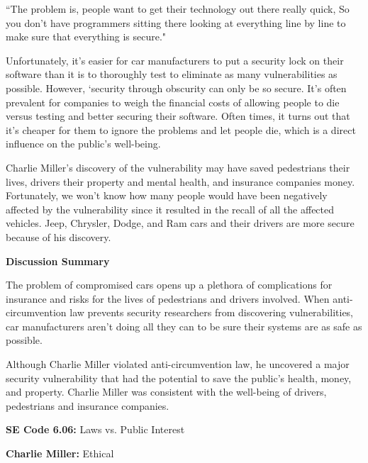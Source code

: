 \documentclass[12pt]{article}
\begin{document}
\begin{multicols}{2}
``The problem is, people want to get their technology out there really quick, So you don’t have programmers sitting there looking at everything line by line to make sure that everything is secure."\cite{insuranceRisks}

Unfortunately, it's easier for car manufacturers to put a security lock on their software than it is to thoroughly test to eliminate as many vulnerabilities as possible. \cite{chris} However, `security through obscurity can only be so secure.\cite{chris} It's often prevalent for companies to weigh the financial costs of allowing people to die versus testing and better securing their software. \cite{turner} Often times, it turns out that it's cheaper for them to ignore the problems and let people die, which is a direct influence on the public's well-being. \cite{turner}

Charlie Miller's discovery of the vulnerability may have saved pedestrians their lives, drivers their property and mental health, and insurance companies money. Fortunately, we won't know how many people would have been negatively affected by the vulnerability since it resulted in the recall of all the affected vehicles. \cite{recall} Jeep, Chrysler, Dodge, and Ram cars and their drivers are more secure because of his discovery. \cite{recall}

\vspace{.5cm}\hspace{-.5cm}\textbf{Discussion Summary}\vspace{.2cm}

The problem of compromised cars opens up a plethora of complications for insurance and risks for the lives of pedestrians and drivers involved. When anti-circumvention law prevents security researchers from discovering vulnerabilities, car manufacturers aren't doing all they can to be sure their systems are as safe as possible. 

Although Charlie Miller violated anti-circumvention law, he uncovered a major security vulnerability that had the potential to save the public's health, money, and property. Charlie Miller was consistent with the well-being of drivers, pedestrians and insurance companies.

\begin{framed}
\hspace{-.67cm}\textbf{SE Code 6.06:} Laws vs. Public Interest

\hspace{-.67cm}\textbf{Charlie Miller:} Ethical
\end{framed}



\end{multicols}
\end{document}
